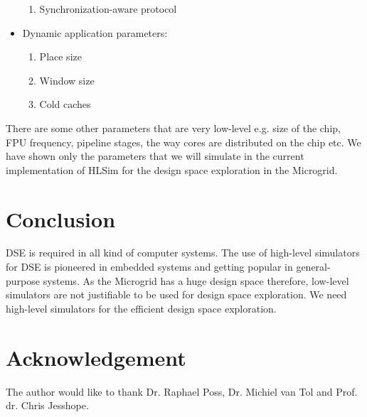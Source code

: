 \documentclass{article}
\begin{document}
\begin{itemize}
\begin{enumerate}
\item Synchronization-aware protocol

\end{enumerate}

\item Dynamic application parameters:

\begin{enumerate}

\item Place size

\item Window size

\item Cold caches

\end{enumerate}

\end{itemize}

There are some other parameters that are very low-level e.g. size of the chip,
FPU frequency, pipeline stages, the way cores are distributed on the chip etc.
We have shown only the parameters that we will simulate in the current
implementation of HLSim for the design space exploration in the Microgrid.

\section{Conclusion}
\label{sn:conclusion}

DSE is required in all kind of computer
systems. The use of high-level simulators for DSE is pioneered in embedded
systems and getting popular in general-purpose systems. As the Microgrid has a
huge design space therefore, low-level simulators are not justifiable to be
used for design space exploration. We need high-level simulators for the
efficient design space exploration. 

\section*{Acknowledgement}
The author would like to thank Dr. Raphael Poss, Dr. Michiel van Tol and Prof.
dr. Chris Jesshope.











\end{document}
